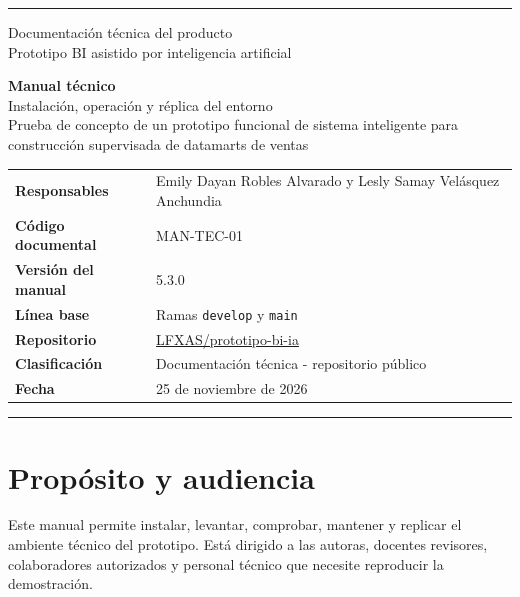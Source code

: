 \documentclass[11pt,letterpaper]{article}
\newcommand{\file}[1]{\texttt{#1}}
\begin{document}
\hypersetup{pageanchor=false}

\begin{titlepage}
  \thispagestyle{empty}
  \vspace*{0.8cm}
  {\color{ugblue}\rule{\textwidth}{2.8pt}}
  \vspace{1.2cm}

  {\Large Documentación técnica del producto\\[0.25em]
  Prototipo BI asistido por inteligencia artificial}

  \vfill

  {\color{deepgreen}\fontsize{30}{35}\selectfont\textbf{Manual técnico}}\\[0.7em]
  {\LARGE Instalación, operación y réplica del entorno}\\[0.6em]
  {\large Prueba de concepto de un prototipo funcional de sistema inteligente para construcción supervisada de datamarts de ventas}

  \vspace{1.5cm}

  \begin{tabularx}{\textwidth}{@{}>{\bfseries}l X@{}}
    Responsables & Emily Dayan Robles Alvarado y Lesly Samay Velásquez Anchundia \\
    Código documental & MAN-TEC-01 \\
    Versión del manual & 5.3.0 \\
    Línea base & Ramas \file{develop} y \file{main} \\
    Repositorio & \href{https://github.com/LFXAS/prototipo-bi-ia}{LFXAS/prototipo-bi-ia} \\
    Clasificación & Documentación técnica - repositorio público \\
    Fecha & 25 de noviembre de 2026 \\
  \end{tabularx}

  \vfill
  {\color{ugblue}\rule{\textwidth}{2.8pt}}
\end{titlepage}

\hypersetup{pageanchor=true}
\tableofcontents
\newpage
{}

\section{Propósito y audiencia}

Este manual permite instalar, levantar, comprobar, mantener y replicar el ambiente técnico del prototipo. Está dirigido a las autoras, docentes revisores, colaboradores autorizados y personal técnico que necesite reproducir la demostración.
\end{document}
